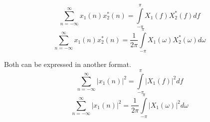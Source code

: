 \begin{equation}\label{eq:FourierTransformProperties-ParsevalsTheorem-Frequency}
  \sum\limits_{n=-\infty}^{\infty} x_{1}(n) x_{2}^{*}(n) = \int\limits_{-\pi}^{\pi} X_{1}(f) X_{2}^{*}(f) df
\end{equation}
\begin{equation}\label{eq:FourierTransformProperties-ParsevalsTheorem-Omega}
  \sum\limits_{n=-\infty}^{\infty} x_{1}(n) x_{2}^{*}(n) = \frac{1}{2 \pi} \int\limits_{-\pi}^{\pi} X_{1}(\omega) X_{2}^{*}(\omega) d\omega
\end{equation}

Both  can be expressed in another format.
\begin{equation}\label{eq:FourierTransformProperties-ParsevalsTheorem-Frequency-Absolute}
  \sum\limits_{n=-\infty}^{\infty} \lvert x_{1}(n) \rvert^{2} = \int\limits_{-\pi}^{\pi} \lvert X_{1}(f) \rvert^{2} df
\end{equation}
\begin{equation}\label{eq:FourierTransformProperties-ParsevalsTheorem-Omega-Absolute}
  \sum\limits_{n=-\infty}^{\infty} \lvert x_{1}(n) \rvert^{2} = \frac{1}{2 \pi} \int\limits_{-\pi}^{\pi} \lvert X_{1}(\omega) \rvert^{2} d\omega
\end{equation}
